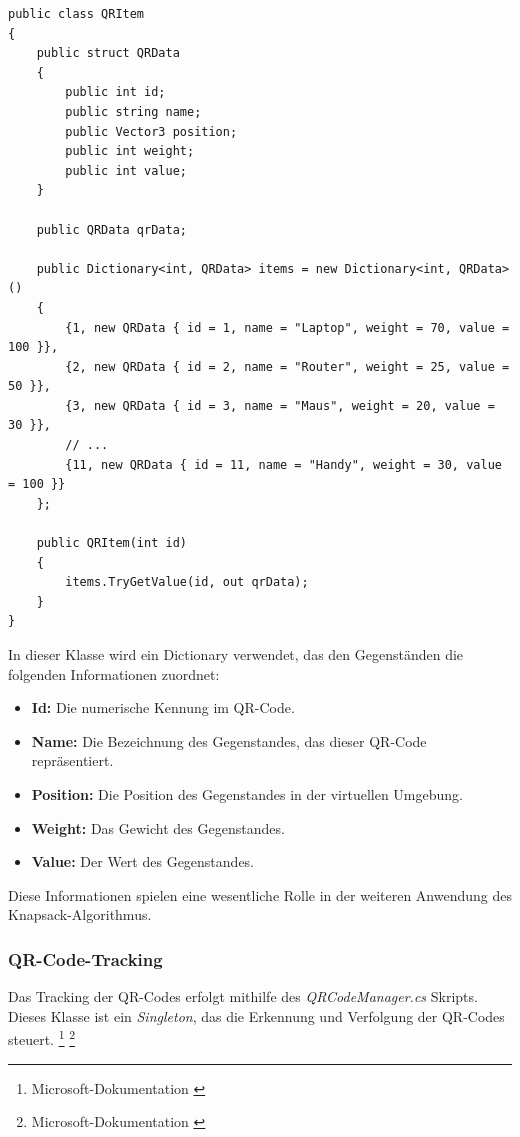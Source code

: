 \begin{itemize}
\begin{lstlisting}[style=csharp, caption={Codeabschnitt von QRItem Klasse}, label=code:update]
public class QRItem
{
    public struct QRData
    {
        public int id;
        public string name;
        public Vector3 position;
        public int weight;
        public int value;
    }

    public QRData qrData;

    public Dictionary<int, QRData> items = new Dictionary<int, QRData>()
    {
        {1, new QRData { id = 1, name = "Laptop", weight = 70, value = 100 }},
        {2, new QRData { id = 2, name = "Router", weight = 25, value = 50 }},
        {3, new QRData { id = 3, name = "Maus", weight = 20, value = 30 }},
        // ...
        {11, new QRData { id = 11, name = "Handy", weight = 30, value = 100 }}
    };

    public QRItem(int id)
    {
        items.TryGetValue(id, out qrData);
    }
}
\end{lstlisting}

In dieser Klasse wird ein Dictionary verwendet, das den Gegenständen die folgenden Informationen zuordnet:

\begin{itemize}
    \item \textbf{Id:} Die numerische Kennung im QR-Code.
    \item \textbf{Name:} Die Bezeichnung des Gegenstandes, das dieser QR-Code repräsentiert.
    \item \textbf{Position:} Die Position des Gegenstandes in der virtuellen Umgebung.
    \item \textbf{Weight:} Das Gewicht des Gegenstandes.
    \item \textbf{Value:} Der Wert des Gegenstandes.
\end{itemize}

Diese Informationen spielen eine wesentliche Rolle in der weiteren Anwendung des Knapsack-Algorithmus.

\subsubsection{QR-Code-Tracking}
Das Tracking der QR-Codes erfolgt mithilfe des \textit{QRCodeManager.cs} Skripts. Dieses Klasse ist ein \textit{Singleton}, das
die Erkennung und Verfolgung der QR-Codes steuert. \footnote{Microsoft-Dokumentation \cite{Singleton}} \footnote{Microsoft-Dokumentation \cite{QR-Code-Tracking}}


\end{itemize}

